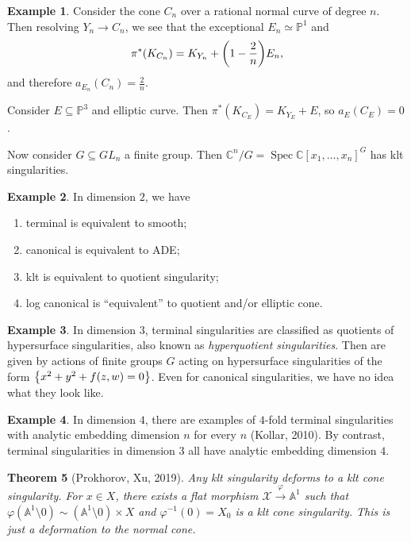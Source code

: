 \documentclass[leqno, openany]{memoir}
\newtheorem{thm}{Theorem}[section]
\theoremstyle{definition}
\newtheorem{exm}[thm]{Example}
\theoremstyle{remark}
\theoremstyle{plain}
\theoremstyle{definition}
\theoremstyle{remark}
\newcommand{\A}{\mathbb{A}}
\newcommand{\C}{\mathbb{C}}
\renewcommand{\P}{\mathbb{P}}
\newcommand{\mc}[1]{\mathcal{#1}}
\DeclareMathOperator{\Spec}{Spec}
\begin{document}
\begin{exm}
    Consider the cone $C_n$ over a rational normal curve of degree $n$. Then resolving $Y_n \to C_n$, we see that the exceptional $E_n \simeq \P^1$ and 
    \[ \pi^* (K_{C_n}) = K_{Y_n} + \qty(1 - \frac{2}{n}) E_n, \] 
    and therefore $a_{E_n}(C_n) = \frac{2}{n}$.

    Consider $E \subseteq \P^3$ and elliptic curve. Then $\pi^*(K_{C_E}) = K_{Y_E} + E$, so $a_E(C_E) = 0$.
\end{exm}

Now consider $G \subseteq GL_n$ a finite group. Then $\C^n/G = \Spec {\C[x_1, \ldots, x_n]}^G$ has klt singularities.

\begin{exm}
    In dimension $2$, we have
    \begin{enumerate}
        \item terminal is equivalent to smooth;
        \item canonical is equivalent to ADE;\@
        \item klt is equivalent to quotient singularity;
        \item log canonical is ``equivalent'' to quotient and/or elliptic cone.
    \end{enumerate}
\end{exm}

\begin{exm}
    In dimension $3$, terminal singularities are classified as quotients of hypersurface singularities, also known as \textit{hyperquotient singularities}. Then are given by actions of finite groups $G$ acting on hypersurface singularities of the form $\qty{x^2 + y^2 + f(z, w) = 0}$. Even for canonical singularities, we have no idea what they look like.
\end{exm}

\begin{exm}
    In dimension $4$, there are examples of $4$-fold terminal singularities with analytic embedding dimension $n$ for every $n$ (Kollar, 2010). By contrast, terminal singularities in dimension $3$ all have analytic embedding dimension $4$.
\end{exm}

\begin{thm}[Prokhorov, Xu, 2019]
    Any klt singularity deforms to a klt cone singularity. For $x \in X$, there exists a flat morphism $\mc{X} \xrightarrow{\varphi} \A^1$ such that $\varphi(\A^1 \setminus 0) \sim (\A^1 \setminus 0) \times X$ and $\varphi^{-1}(0) = X_0$ is a klt cone singularity. This is just a deformation to the normal cone.
\end{thm}
\end{document}
